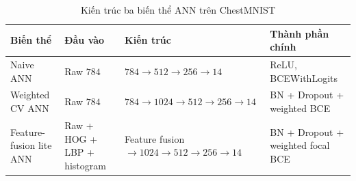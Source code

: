 \begin{table}[H]
\centering
\caption{Kiến trúc ba biến thể ANN trên ChestMNIST}
\label{tab:chestmnist-ann-architecture-details}
\small
\begin{tabularx}{\textwidth}{>{\raggedright\arraybackslash}p{3.3cm} >{\raggedright\arraybackslash}p{3.1cm} >{\raggedright\arraybackslash}X >{\raggedright\arraybackslash}p{3.2cm}}
\toprule
Biến thể & Đầu vào & Kiến trúc & Thành phần chính \\
\midrule
Naive ANN & Raw $784$ & $784 \rightarrow 512 \rightarrow 256 \rightarrow 14$ & ReLU, BCEWithLogits \\
Weighted CV ANN & Raw $784$ & $784 \rightarrow 1024 \rightarrow 512 \rightarrow 256 \rightarrow 14$ & BN + Dropout + weighted BCE \\
Feature-fusion lite ANN & Raw + HOG + LBP + histogram & Feature fusion $\rightarrow 1024 \rightarrow 512 \rightarrow 256 \rightarrow 14$ & BN + Dropout + weighted focal BCE \\
\bottomrule
\end{tabularx}
\end{table}
